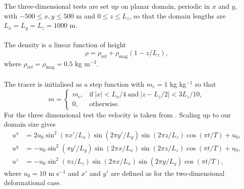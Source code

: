 \documentclass[11pt,a4paper]{article}
\begin{document}
The three-dimensional tests are set up on planar domain, periodic in $x$ and $y$, with $-500 \leq x,y \leq 500$ m and $0 \leq z \leq L_z$, so that the domain lengths are $L_x=L_y=L_z=1000$ m. \\
\\
The density is a linear function of height
\begin{equation}
    \rho = \rho_{\mathrm{ref}} + \rho_{\mathrm{mag}}(1-z/L_z),
\end{equation}
where $ \rho_{\mathrm{ref}}=\rho_{\mathrm{mag}} = 0.5$ kg m$^{-3}$.  \\
\\
The tracer is initialised as a step function with $m_c=1$ kg kg$^{-1}$ so that
\begin{equation}
    m = 
    \begin{cases}
        m_c, & \mathrm{if} \ |x| < L_x/4 \ \mathrm{and} \ |z-L_z/2|< 3L_z/10, \\
        0, & \mathrm{otherwise}.
    \end{cases}
\end{equation}
For the three dimensional test the velocity is taken from \cite{skamarock2006limiters}. Scaling up to our domain size gives
\begin{subequations}
\begin{align}
u^x & =  2 u_0 \sin^2(\pi x'/L_x)\sin(2 \pi y'/L_y)\sin(2 \pi z/L_z)\cos(\pi t/T)+u_0,\\ 
u^y & = -u_0 \sin^2(\pi y'/L_y)\sin(2 \pi x/L_x)\sin(2 \pi z/L_z)\cos(\pi t/T)+u_0,\\ 
u^z & = -u_0 \sin^2(\pi z/L_z)\sin(2 \pi x/L_x)\sin(2 \pi y/L_y)\cos(\pi t/T),
\end{align}
\end{subequations}
where $u_0=10$ m s$^{-1}$ and $x'$ and $y'$ are defined as for the two-dimensional deformational case. 



\end{document}

